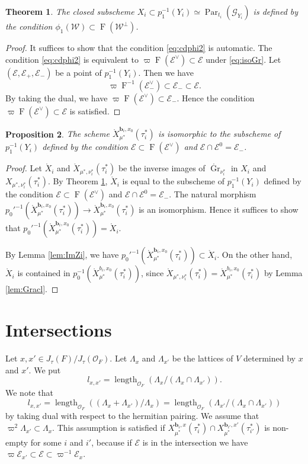 \documentclass[12pt,a4paper]{article}
\newtheorem{thm}{Theorem}[section]
\newtheorem{prop}[thm]{Proposition}
\DeclareMathOperator{\length}{length}
\DeclareMathOperator{\Gr}{Gr}
\DeclareMathOperator{\Par}{Par}
\DeclareMathOperator{\oF}{F}
\newcommand{\bfb}{\mathbf{b}}
\newcommand{\cE}{\mathcal{E}}
\newcommand{\cO}{\mathcal{O}}
\newcommand{\sG}{\mathscr{G}}
\newcommand{\sW}{\mathscr{W}}
\begin{document}
\begin{thm}\label{thm:pZi}
The closed subscheme 
$X_i \subset p_1^{-1}(Y_i) \simeq \Par_{t_i}(\sG_{Y_i})$ 
is defined by the condition 
$\phi_1 (\sW) \subset \oF (\sW^{\perp})$. 
\end{thm}
\begin{proof}
It suffices to show that 
the condition \eqref{eq:cdphi2} 
is automatic. 
The condition \eqref{eq:cdphi2} is equivalent to 
$\varpi \oF (\cE^{\vee}) \subset \cE$ under \eqref{eq:isoGr}. 
Let $(\cE,\cE_+,\cE_-)$ be a point of 
$p_1^{-1}(Y_i)$. Then we have 
\[
 \varpi \oF^{-1}(\cE_-^{\vee}) \subset \cE_- 
 \subset \cE . 
\]
By taking the dual, we have 
$\varpi \oF (\cE^{\vee}) \subset \cE_-$. 
Hence 
the condition 
$\varpi \oF (\cE^{\vee}) \subset \cE$ 
is satisfied. 
\end{proof}


\begin{prop}\label{prop:Xopen}
The scheme 
$\mathring{X}_{\mu^*}^{\bfb_i,x_0}(\tau_i^*)$ 
is isomorphic to the subscheme of 
$p_1^{-1}(Y_i)$ 
defined by the condition 
$\cE \subset \oF (\cE^{\vee})$ and 
$\cE \cap \cE^0 =\cE_-$. 
\end{prop}
\begin{proof}
Let $\mathring{X}_i$ and $\mathring{X}_{\mu^*,\nu_i^*}(\tau_i^*)$ 
be the inverse images of $\mathring{\Gr}_{\nu_i^*}$ 
in $X_i$ and $X_{\mu^*,\nu_i^*}(\tau_i^*)$. 
By Theorem \ref{thm:pZi}, 
$\mathring{X}_i$ is equal to the subscheme of 
$p_1^{-1}(Y_i)$ 
defined by the condition 
$\cE \subset \oF (\cE^{\vee})$ and 
$\cE \cap \cE^0 =\cE_-$. 
The natural morphism 
$p_0'^{-1}(\mathring{X}_{\mu^*}^{\bfb_i,x_0}(\tau_i^*)) \to 
\mathring{X}_{\mu^*}^{\bfb_i,x_0}(\tau_i^*)$ 
is an isomorphism. Hence it suffices to show that 
$p_0'^{-1}(\mathring{X}_{\mu^*}^{\bfb_i,x_0}(\tau_i^*))=\mathring{X}_i$. 

By Lemma \ref{lem:ImZi}, we have 
$p_0'^{-1}(\mathring{X}_{\mu^*}^{\bfb_i,x_0}(\tau_i^*))\subset \mathring{X}_i$. 
On the other hand, 
$\mathring{X}_i$ is contained in 
$p_0^{-1}(\mathring{X}^{b_i,x_0}_{\mu^*}(\tau_i^*))$, 
since 
$\mathring{X}_{\mu^*,\nu_i^*}(\tau_i^*)
=\mathring{X}^{b_i,x_0}_{\mu^*}(\tau_i^*)$ 
by Lemma \ref{lem:Gracl}. 
\end{proof}




\section{Intersections}\label{sec:Int}
Let $x,x' \in J_{\tau}(F)/J_{\tau}(\cO_F)$. 
Let $\Lambda_x$ and $\Lambda_{x'}$ be the lattices of $V$ 
determined by $x$ and $x'$. 
We put 
\[
 l_{x,x'}=\length_{\cO_F}\left( \Lambda_x/(\Lambda_x \cap \Lambda_{x'}) \right) . 
\]
We note that 
\[
 l_{x,x'}=\length_{\cO_F}\left( (\Lambda_x +\Lambda_{x'})/\Lambda_x \right)=\length_{\cO_F}\left( \Lambda_{x'}/(\Lambda_x \cap \Lambda_{x'}) \right) 
\]
by taking dual with respect to the hermitian pairing. 
We assume that $\varpi^2 \Lambda_{x'} \subset \Lambda_x$. This assumption is satisfied if $X_{\mu^*}^{\bfb_i,x}(\tau_i^*) \cap X_{\mu^*}^{\bfb_{i'},x'}(\tau_{i'}^*)$ is non-empty for some $i$ and $i'$, because if $\cE$ is in the intersection we have $\varpi \cE_{x'} \subset \cE \subset \varpi^{-1} \cE_x$. 
\end{document}
